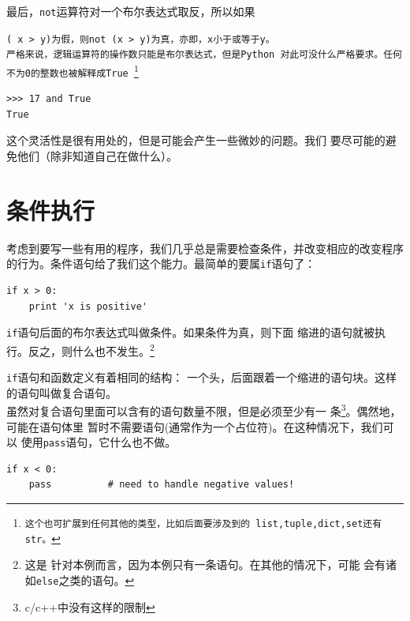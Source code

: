 最后，{\tt not}运算符对一个布尔表达式取反，所以如果{\tt (
x > y)为假，则{\tt not (x > y)}为真，亦即，{\tt x}小于或等于{\tt y}。\\

严格来说，逻辑运算符的操作数只能是布尔表达式，但是Python
对此可没什么严格要求。任何不为0的整数也被解释成{\tt True}
\footnote{这个也可扩展到任何其他的类型，比如后面要涉及到的
list,tuple,dict,set还有str。}

\beforeverb
\begin{verbatim}
>>> 17 and True
True
\end{verbatim}
\afterverb

这个灵活性是很有用处的，但是可能会产生一些微妙的问题。我们
要尽可能的避免他们（除非知道自己在做什么）。

\section{条件执行}
\label{conditional execution}


考虑到要写一些有用的程序，我们几乎总是需要检查条件，并改变相应的改变程序的行为。条件语句给了我们这个能力。最简单的要属{\tt if}语句了：



\beforeverb
\begin{verbatim}
if x > 0:
    print 'x is positive'
\end{verbatim}
\afterverb
{\tt if}语句后面的布尔表达式叫做条件。如果条件为真，则下面
缩进的语句就被执行。反之，则什么也不发生。\footnote{这是
针对本例而言，因为本例只有一条语句。在其他的情况下，可能
会有诸如{\tt else}之类的语句。}


{\tt if}语句和函数定义有着相同的结构：
一个头，后面跟着一个缩进的语句块。这样的语句叫做复合语句。\\

虽然对复合语句里面可以含有的语句数量不限，但是必须至少有一
条\footnote{c/c++中没有这样的限制}。偶然地，可能在语句体里
暂时不需要语句(通常作为一个占位符)。在这种情况下，我们可以
使用{\tt pass}语句，它什么也不做。




\beforeverb
\begin{verbatim}
if x < 0:
    pass          # need to handle negative values!
\end{verbatim}
\afterverb

}
